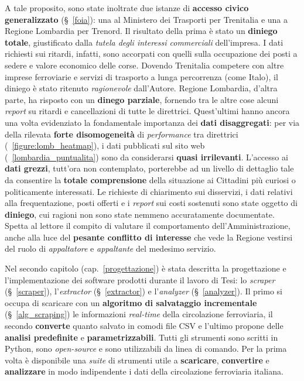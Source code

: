 \documentclass[12pt,a4paper,italian]{report}
\begin{document}
A tale proposito, sono state inoltrate due istanze di \textbf{accesso
    civico generalizzato} (\S~\ref{foia}): una al Ministero dei
Trasporti per Trenitalia e una a Regione Lombardia per Trenord.  Il
risultato della prima è stato un \textbf{diniego totale}, giustificato
dalla \textit{tutela degli interessi commerciali} dell'impresa.  I
dati richiesti sui ritardi, infatti, sono accorpati con quelli sulla
occupazione dei posti a sedere e valore economico delle corse.
Dovendo Trenitalia competere con altre imprese ferroviarie e servizi
di trasporto a lunga percorrenza (come Italo), il diniego è stato
ritenuto \textit{ragionevole} dall'Autore.  Regione Lombardia, d'altra
parte, ha risposto con un \textbf{dinego parziale}, fornendo tra le
altre cose alcuni \textit{report} su ritardi e cancellazioni di tutte
le direttrici.  Quest'ultimi hanno ancora una volta evidenziato la
fondamentale importanza dei \textbf{dati disaggregati}: per via della
rilevata \textbf{forte disomogeneità} di \textit{performance} tra
direttrici (\figurename~\ref{figure:lomb_heatmap}), i dati pubblicati
sul sito web (\figurename~\ref{lombardia_puntualita}) sono da
considerarsi \textbf{quasi irrilevanti}.  L'accesso ai \textbf{dati
    grezzi}, tutt'ora non contemplato, porterebbe ad un livello di
dettaglio tale da consentire la \textbf{totale comprensione} della
situazione ai Cittadini più curiosi o politicamente interessati.  Le
richieste di chiarimento sui disservizi, i dati relativi alla
frequentazione, posti offerti e i \textit{report} sui costi sostenuti
sono state oggetto di \textbf{diniego}, cui ragioni non sono state
nemmeno accuratamente documentate.  Spetta al lettore il compito di
valutare il comportamento dell'Amministrazione, anche alla luce del
\textbf{pesante conflitto di interesse} che vede la Regione vestirsi
del ruolo di \textit{appaltatore} e \textit{appaltante} del medesimo
servizio.

Nel secondo capitolo (cap.\@~\ref{progettazione}) è stata descritta la
progettazione e l'implementazione dei software prodotti durante il
lavoro di Tesi: lo \textit{scraper} (\S~\ref{scraper}),
l'\textit{extractor} (\S~\ref{extractor}) e l'\textit{analyzer}
(\S~\ref{analyzer}).  Il primo si occupa di scaricare con un
\textbf{algoritmo di salvataggio incrementale} (\S~\ref{alg_scraping})
le informazioni \textit{real-time} della circolazione ferroviaria, il
secondo \textbf{converte} quanto salvato in comodi file CSV e l’ultimo
propone delle \textbf{analisi predefinite} e
\textbf{parametrizzabili}.  Tutti gli strumenti sono scritti in
Python, sono \textit{open-source} e sono utilizzabili da linea di
comando.  Per la prima volta è disponibile una \textit{suite} di
strumenti utile a \textbf{scaricare}, \textbf{convertire} e
\textbf{analizzare} in modo indipendente i dati della circolazione
ferroviaria italiana.
\end{document}
